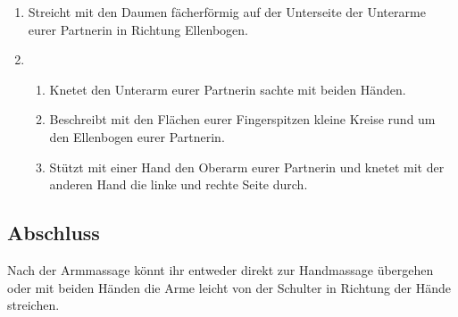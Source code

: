 \begin{enumerate}
	\item {} Streicht mit den Daumen fächerförmig auf der Unterseite der Unterarme eurer Partnerin in Richtung Ellenbogen.
	\item {}
	\begin{enumerate}
		\item {} Knetet den Unterarm eurer Partnerin sachte mit beiden Händen.
		\item {} Beschreibt mit den Flächen eurer Fingerspitzen kleine Kreise rund um den Ellenbogen eurer Partnerin.
		\item {} Stützt mit einer Hand den Oberarm eurer Partnerin und knetet mit der anderen Hand die linke und rechte Seite durch.
	\end{enumerate}
\end{enumerate}

\subsection{Abschluss}
Nach der Armmassage könnt ihr entweder direkt zur Handmassage übergehen oder mit beiden Händen die Arme leicht von der Schulter in Richtung der Hände streichen.
